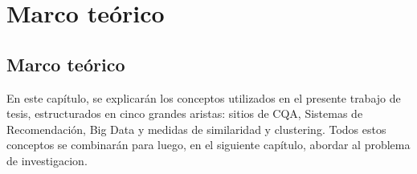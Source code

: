 \chapter*{Marco teórico}\label{ch:marcoteorico}

\section*{Marco teórico}
\addtocounter{section}{1}
\setcounter{subsection}{0}

En este capítulo, se explicarán los conceptos utilizados en el presente trabajo de tesis, estructurados en cinco grandes aristas: sitios de CQA, Sistemas de Recomendación, Big Data y medidas de similaridad y clustering. Todos estos conceptos se combinarán para luego, en el siguiente capítulo, abordar al problema de investigacion.








